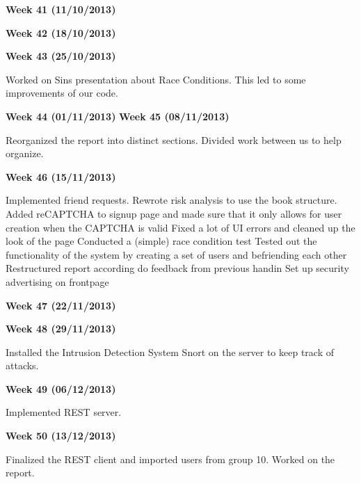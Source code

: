 \textbf{Week 41 (11/10/2013)}


\textbf{Week 42 (18/10/2013)}


\textbf{Week 43 (25/10/2013)}

Worked on Sins presentation about Race Conditions. This led to some improvements of our code.

\textbf{Week 44 (01/11/2013)}
\textbf{Week 45 (08/11/2013)}

Reorganized the report into distinct sections.
Divided work between us to help organize.

\textbf{Week 46 (15/11/2013)}

Implemented friend requests.
Rewrote risk analysis to use the book structure.
Added reCAPTCHA to signup page and made sure that it only allows for user creation when the CAPTCHA is valid
Fixed a lot of UI errors and cleaned up the look of the page
Conducted a (simple) race condition test
Tested out the functionality of the system by creating a set of users and befriending each other
Restructured report according do feedback from previous handin
Set up security advertising on frontpage

\textbf{Week 47 (22/11/2013)}

\textbf{Week 48 (29/11/2013)}

Installed the Intrusion Detection System Snort on the server to keep track of attacks.

\textbf{Week 49 (06/12/2013)}

Implemented REST server.

\textbf{Week 50 (13/12/2013)}

Finalized the REST client and imported users from group 10. Worked on the report.
